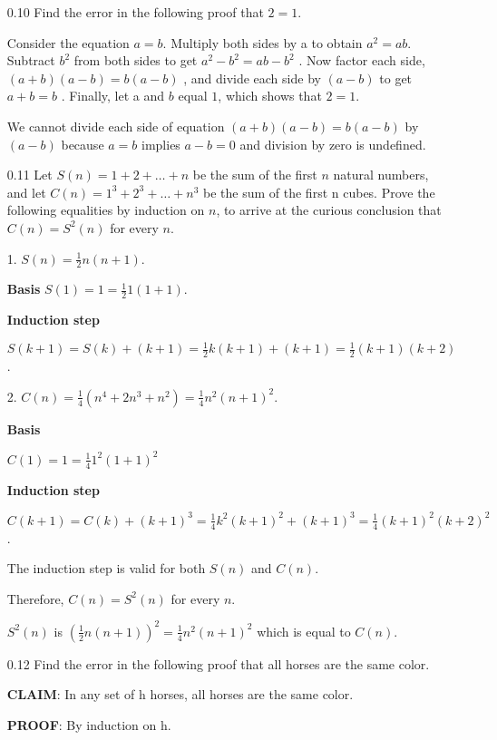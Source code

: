 
\begin{enumerate}

    \item[0.10]
Find the error in the following proof that $2 = 1$. 

Consider the equation $a = b$. Multiply both sides by a to obtain 
$a^2 = ab$. 
Subtract 
$b^2$ 
from both sides to get 
$a^2 - b^2 = ab - b^2$
. Now factor each side, 
$(a + b)(a - b) = b(a - b)$
, and divide each side by 
$(a - b)$ 
to get 
$a + b = b$
. Finally, let a and $b$ equal $1$, which shows that $2 = 1$.


We cannot divide each side of equation $(a + b)(a - b) = b(a - b)$ by $(a - b)$ because $a = b$ implies $a - b = 0$ and division by zero is undefined.

    \item[0.11]
Let $S(n) = 1 + 2 + \ldots + n$ be the sum of the first $n$ natural numbers, and let $C(n) = 1^3 + 2^3 + \ldots + n^3$ be the sum of the first n cubes. Prove the following equalities by induction on $n$, to arrive at the curious conclusion that $C(n) = S^2(n)$ for every $n$.

1. $S(n) = \frac{1}{2} n(n+1)$.

\textbf{Basis}
$ S(1) = 1 = \frac{1}{2} 1(1+1)$.

\textbf{Induction step}

$ S(k+1) = S(k) + (k+1) = \frac{1}{2} k(k+1) + (k+1) = \frac{1}{2} (k+1)(k+2)$.

2. $C(n) = \frac{1}{4}(n^4 + 2n^3 + n^2) = \frac{1}{4} n^2(n+1)^2$.

\textbf{Basis}

$ C(1) = 1 = \frac{1}{4} 1^2(1+1)^2$

\textbf{Induction step}

$ C(k+1) = C(k) + (k+1)^3 = \frac{1}{4} k^2(k+1)^2 + (k+1)^3 = \frac{1}{4} (k+1)^2(k+2)^2$.

The induction step is valid for both $S(n)$ and $C(n)$. 

Therefore, $C(n) = S^2(n)$ for every $n$.

$S^2(n)$ is $(\frac{1}{2} n(n+1))^2 = \frac{1}{4} n^2(n+1)^2$ which is equal to $C(n)$.

    \item[0.12]
Find the error in the following proof that all horses are the same color.

\textbf{CLAIM}: In any set of h horses, all horses are the same color.

\textbf{PROOF}: By induction on h.


\end{enumerate}
